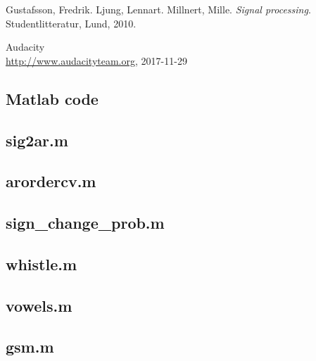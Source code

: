 \documentclass{IEEEtran}
\begin{document}
\begin{thebibliography}{9}

  Gustafsson, Fredrik. Ljung, Lennart. Millnert, Mille.
  \textit{Signal processing}.
  Studentlitteratur, Lund,
  2010.

  Audacity \\
  \url{http://www.audacityteam.org},
  2017-11-29

\end{thebibliography}
\newpage
\begin{appendices}

    \section{Matlab code}
    \subsection{sig2ar.m}\label{code:sig2ar}
    
    \subsection{arordercv.m}\label{code:arordercv}
    
    \subsection{sign\_change\_prob.m}\label{code:signchangeprob}
    
    \subsection{whistle.m}\label{code:whistle}
    
    \subsection{vowels.m}\label{code:vowels}
    
    \subsection{gsm.m}\label{code:gsm}
    
\end{appendices}
\end{document}
